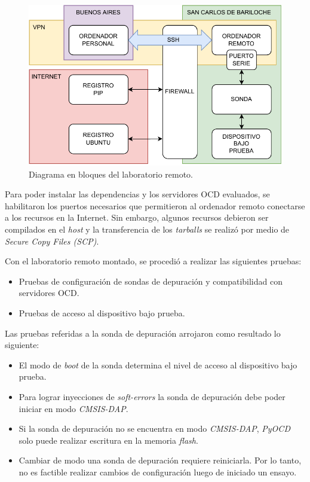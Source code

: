\begin{figure}[htbp]
	\centering
	\includegraphics[width=\textwidth]{./Figures/vpn.pdf}
    \caption{Diagrama en bloques del laboratorio remoto.}
	\label{fig:remotelab}
\end{figure}

Para poder instalar las dependencias y los servidores OCD evaluados, se habilitaron los puertos necesarios que permitieron al ordenador remoto conectarse a los recursos en la Internet.
Sin embargo, algunos recursos debieron ser compilados en el \emph{host} y la transferencia de los \emph{tarballs} se realizó por medio de \emph{Secure Copy Files (SCP)}.

Con el laboratorio remoto montado, se procedió a realizar las siguientes pruebas:
\begin{itemize}
    \item Pruebas de configuración de sondas de depuración y compatibilidad con servidores OCD.
    \item Pruebas de acceso al dispositivo bajo prueba.
\end{itemize}

Las pruebas referidas a la sonda de depuración arrojaron como resultado lo siguiente:

\begin{itemize}
    \item El modo de \emph{boot} de la sonda determina el nivel de acceso al dispositivo bajo prueba.
    \item Para lograr inyecciones de \emph{soft-errors} la sonda de depuración debe poder iniciar en modo \emph{CMSIS-DAP}.
    \item Si la sonda de depuración no se encuentra en modo \emph{CMSIS-DAP}, \emph{PyOCD} solo puede realizar escritura en la memoria \emph{flash}.
    \item Cambiar de modo una sonda de depuración requiere reiniciarla.
        Por lo tanto, no es factible realizar cambios de configuración luego de iniciado un ensayo.
\end{itemize}


